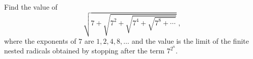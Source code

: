 Find the value of
\[
\sqrt{7+\sqrt{7^2+\sqrt{7^4+\sqrt{7^8+\cdots}}}}\ ,
\]
where the exponents of $7$ are $1,2,4,8,\dots$ and the value is the limit of the finite nested radicals obtained by stopping after the term $7^{2^n}$.
